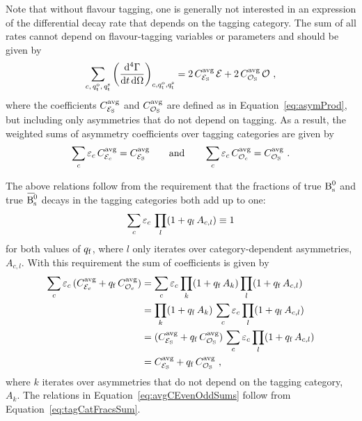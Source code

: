 Note that without flavour tagging, one is generally not interested in an expression of the differential decay rate that depends on the
tagging category. The sum of all rates cannot depend on flavour-tagging variables or parameters and should be given by
\begin{equation}
  \sum_{c,\,\qtOS,\,\qtSS} \left(\frac{\ud^4\Gamma}{\ud t\, \ud\Omega}\right)_{c,\qtOS,\qtSS}
    = 2\,\avgCEven[\text{S}]\, \even + 2\,\avgCOdd[\text{S}]\, \odd \ ,
\end{equation}
where the coefficients $\avgCEven[\text{S}]$ and $\avgCOdd[\text{S}]$ are defined as in Equation~\ref{eq:asymProd}, but including only
asymmetries that do not depend on tagging. As a result, the weighted sums of asymmetry coefficients over tagging categories are given by
\begin{equation}
  \label{eq:avgCEvenOddSums}
  \sum_c \tagCatCoef[c]\, \avgCEven[c] = \avgCEven[\text{S}]
  \qquad\text{and}\qquad
  \sum_c \tagCatCoef[c]\, \avgCOdd[c] = \avgCOdd[\text{S}] \ .
\end{equation}

The above relations follow from the requirement that the fractions of true $\Bs$ and true $\Bsbar$ decays in the tagging categories both
add up to one:
\begin{equation}
  \sum_c \tagCatCoef[c]\,\prod_l (1+\qf\, A_{c,l}) \equiv 1
\end{equation}
for both values of $\qf$, where $l$ only iterates over category-dependent asymmetries, $A_{c,l}$. With this requirement the sum of
coefficients is given by
\begin{equation}
  \label{eq:tagCatFracsSum}
  \begin{aligned}
    \sum_c \tagCatCoef[c]\, (\avgCEven[c]+\qf\,\avgCOdd[c])
      &= \sum_c \tagCatCoef[c] \prod_k (1+\qf\,A_k) \prod_l (1+\qf\,A_{c,l}) \\
      &= \prod_k (1+\qf\,A_k)\, \sum_c \tagCatCoef[c] \prod_l (1+\qf\,A_{c,l}) \\
      &= (\avgCEven[\text{S}] + \qf\,\avgCOdd[\text{S}])\, \sum_c \tagCatCoef[c] \prod_l (1+\qf\,A_{c,l}) \\
      &= \avgCEven[\text{S}] + \qf\,\avgCOdd[\text{S}] \ ,
  \end{aligned}
\end{equation}
where $k$ iterates over asymmetries that do not depend on the tagging category, $A_k$. The relations in Equation~\ref{eq:avgCEvenOddSums}
follow from Equation~\ref{eq:tagCatFracsSum}.


